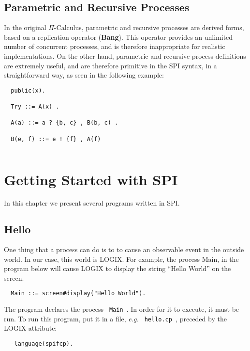 \section{Parametric and Recursive Processes}

In the original $\Pi$-Calculus, parametric and recursive processes are
derived forms, based on a replication operator ({\bf Bang}).  This operator
provides an unlimited number of concurrent processes, and is therefore
inappropriate for realistic implementations. On the other hand,
parametric and recursive process definitions are extremely useful, and
are therefore primitive in the SPI syntax, in a straightforward way,
as seen in the following example:

\begin{verbatim}
  public(x).

  Try ::= A(x) .

  A(a) ::= a ? {b, c} , B(b, c) .

  B(e, f) ::= e ! {f} , A(f) 
 
\end{verbatim}


\chapter{Getting Started with SPI}
\label{simple programs}

In this chapter we present several programs written in SPI.

\section{Hello}

One thing that a process can do is to to cause an observable
event in the outside world. In our case, this world is LOGIX.
For example, the process Main, in the program below will cause
LOGIX to display the string ``Hello World'' on the screen.

\begin{verbatim}
  Main ::= screen#display("Hello World").
\end{verbatim}

\noindent

The program declares the process \verb+ Main +. In order for it to execute,
it must be run.  To run this program, put it in a file,
{\em e.g.} \verb+ hello.cp +, preceded by the LOGIX attribute:

\begin{verbatim}
  -language(spifcp).
\end{verbatim}

